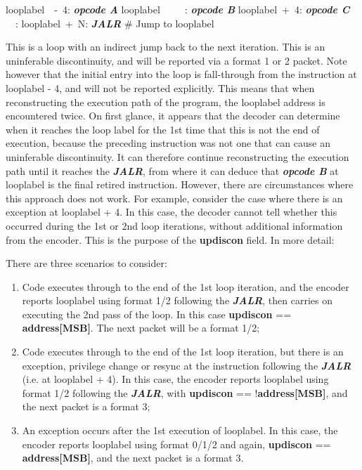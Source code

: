 looplabel~~-~4: \textbf{\textit{opcode A}} \newline
looplabel~~~~~: \textbf{\textit{opcode B}} \newline
looplabel~+~4: \textbf{\textit{opcode C}} \newline
~~: \newline
looplabel~+~N: \textbf{\textit{JALR}} \# Jump to looplabel\newline

This is a loop with an indirect jump back to the next iteration.  This is an uninferable discontinuity, and will be
reported via a format 1 or 2 packet.  Note however that the initial entry into the loop is fall-through from the
instruction at looplabel - 4, and will not be reported explicitly.  This means that when reconstructing the execution 
path of the program, the looplabel address is encountered twice.  On first glance, it appears that the decoder can determine
when it reaches the loop label for the 1st time that this is not the end of execution, because the preceding
instruction was not one that can cause an uninferable discontinuity.  It can therefore continue reconstructing the 
execution path until it reaches the \textbf{\textit{JALR}}, from where it can deduce that \textbf{\textit{opcode B}} at
looplabel is the final retired instruction.  However, there are circumstances where this approach 
does not work.  For example, consider the case where there is an exception at looplabel + 4.  In this case, the decoder
cannot tell whether this occurred during the 1st or 2nd loop iterations, without additional information from the 
encoder.  This is the purpose of the \textbf{updiscon} field.  In more detail:

There are three scenarios to consider:

\begin{enumerate}
  \item Code executes through to the end of the 1st loop iteration, and the encoder reports looplabel using format 1/2 following 
    the \textbf{\textit{JALR}}, then carries on executing the 2nd pass of the loop.  In this case \textbf{updiscon} == \textbf{address[MSB]}.  
    The next packet will be a format 1/2;
  \item Code executes through to the end of the 1st loop iteration, but there is an exception, privilege change or resync at
    the instruction following the \textbf{\textit{JALR}} (i.e. at looplabel + 4).  In this case, the encoder reports looplabel using 
    format 1/2 following the \textbf{\textit{JALR}}, with \textbf{updiscon} == !\textbf{address[MSB]}, and the next packet is a 
    format 3;
  \item An exception occurs after the 1st execution of looplabel.  In this case, the encoder reports looplabel using format 0/1/2 and again,
    \textbf{updiscon} == \textbf{address[MSB]}, and the next packet is a format 3.
\end{enumerate}

